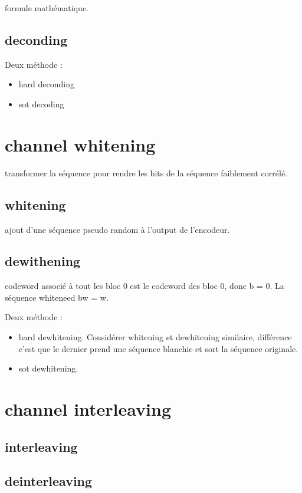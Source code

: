 \documentclass[12pt,a4paper,oneside, titlepage]{report}
\begin{document}
formule mathématique.

\subsection{deconding}

Deux méthode :

\begin{itemize}
\item hard deconding
\item sot decoding
\end{itemize}

\section{channel whitening}

transformer la séquence pour rendre les bits de la séquence faiblement corrélé.

\subsection{whitening}

ajout d'une séquence pseudo random à l'output de l'encodeur.

\subsection{dewithening}

codeword associé à tout les bloc 0 est le codeword des bloc 0, donc b = 0. La séquence whiteneed bw = w.

Deux méthode :

\begin{itemize}
\item hard dewhitening. Considérer whitening et dewhitening similaire, différence c'est que le dernier prend une séquence blanchie et sort la séquence originale.
\item sot dewhitening. 
\end{itemize}


\section{channel interleaving}

\subsection{interleaving}

\subsection{deinterleaving}
\end{document}
